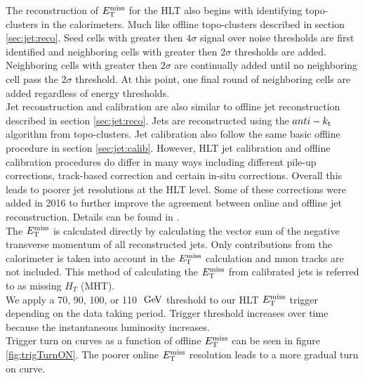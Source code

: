 \indent The reconstruction of $E_{\mathrm{T}}^{\mathrm{miss}}$ for the HLT also begins with identifying topo-clusters in the calorimeters.  Much like offline topo-clusters described in section \ref{sec:jet:reco}.  Seed cells with greater then $4\sigma$ signal over noise thresholds are first identified and neighboring cells with greater then $2\sigma$ thresholds are added.  Neighboring cells with greater then $2\sigma$ are continually added until no neighboring cell pass the $2\sigma$ threshold.  At this point, one final round of neighboring cells are added regardless of energy thresholds. \\

\indent Jet reconstruction and calibration are also similar to offline jet reconstruction described in section \ref{sec:jet:reco}.  Jets are reconstructed using the $anti-k_{\rm{t}}$ algorithm from topo-clusters.  Jet calibration also follow the same basic offline procedure in section \ref{sec:jet:calib}. However, HLT jet calibration and offline calibration procedures do differ in many ways including different pile-up corrections, track-based correction and certain in-situ corrections.  Overall this leads to poorer jet resolutions at the HLT level.  Some of these corrections were added in 2016 to further improve the agreement between online and offline jet reconstruction.  Details can be found in \cite{Trigger2016}. \\

\indent The $E_{\mathrm{T}}^{\mathrm{miss}}$ is calculated directly by calculating the vector sum of the negative transverse momentum of all reconstructed jets.  Only contributions from the calorimeter is taken into account in the $E_{\mathrm{T}}^{\mathrm{miss}}$ calculation and muon tracks are not included.  This method of calculating the $E_{\mathrm{T}}^{\mathrm{miss}}$ from calibrated jets is referred to as missing $H_T$ (MHT).  \\

\indent We apply a 70, 90, 100, or 110 $\gev$ threshold to our HLT $E_{\mathrm{T}}^{\mathrm{miss}}$ trigger depending on the data taking period.  Trigger threshold increases over time because the instantaneous luminosity increases. \\

\indent Trigger turn on curves as a function of offline $E_{\mathrm{T}}^{\mathrm{miss}}$ can be seen in figure \ref{fig:trigTurnON}.  The poorer online $E_{\mathrm{T}}^{\mathrm{miss}}$ resolution leads to a more gradual turn on curve. \\

